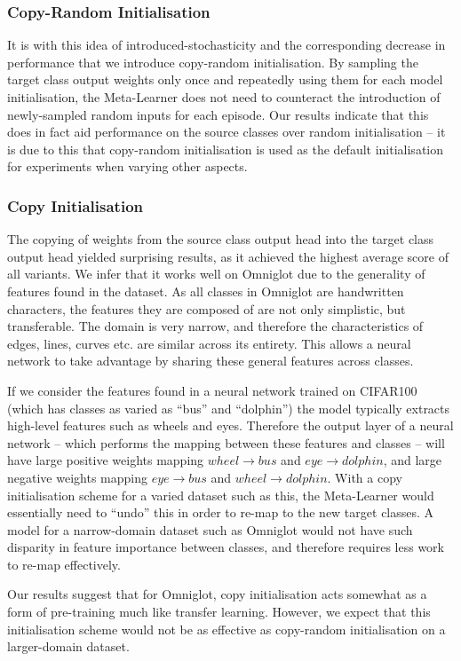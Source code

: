 \documentclass{report}
\begin{document}
\subsubsection{Copy-Random Initialisation}
It is with this idea of introduced-stochasticity and the corresponding decrease in performance that we introduce copy-random initialisation. By sampling the target class output weights only once and repeatedly using them for each model initialisation, the Meta-Learner does not need to counteract the introduction of newly-sampled random inputs for each episode. Our results indicate that this does in fact aid performance on the source classes over random initialisation -- it is due to this that copy-random initialisation is used as the default initialisation for experiments when varying other aspects.

\subsubsection{Copy Initialisation}
The copying of weights from the source class output head into the target class output head yielded surprising results, as it achieved the highest average score of all variants. We infer that it works well on Omniglot due to the generality of features found in the dataset. As all classes in Omniglot are handwritten characters, the features they are composed of are not only simplistic, but transferable. The domain is very narrow, and therefore the characteristics of edges, lines, curves etc. are similar across its entirety. This allows a neural network to take advantage by sharing these general features across classes. \par
If we consider the features found in a neural network trained on CIFAR100 (which has classes as varied as ``bus'' and ``dolphin'') the model typically extracts high-level features such as wheels and eyes\parencite{deepvis}. Therefore the output layer of a neural network -- which performs the mapping between these features and classes -- will have large positive weights mapping $wheel\rightarrow bus$ and $eye\rightarrow dolphin$, and large negative weights mapping $eye\rightarrow bus$ and $wheel\rightarrow dolphin$. With a copy initialisation scheme for a varied dataset such as this, the Meta-Learner would essentially need to ``undo'' this in order to re-map to the new target classes. A model for a narrow-domain dataset such as Omniglot would not have such disparity in feature importance between classes, and therefore requires less work to re-map effectively. \par
Our results suggest that for Omniglot, copy initialisation acts somewhat as a form of pre-training much like transfer learning. However, we expect that this initialisation scheme would not be as effective as copy-random initialisation on a larger-domain dataset.
\end{document}
